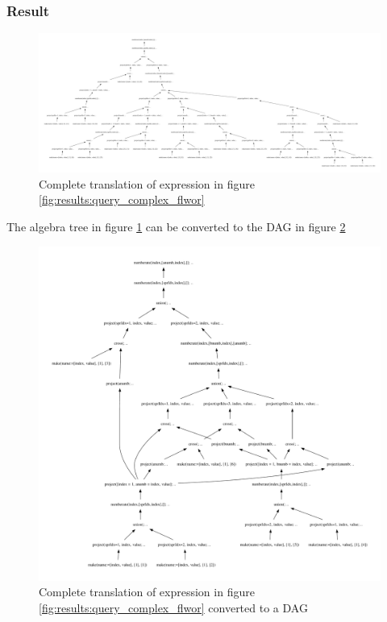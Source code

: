 \subsubsection{Result}
\begin{figure}[!htp]
\begin{center}
  \includegraphics[angle=90,height=0.7\textheight]{img/graphs/td_impl_flwor_complex_xq_relalg} \caption{Complete
  translation of expression in figure
  \ref{fig:results:query_complex_flwor}}
  \label{fig:results:query_complex_flwor_result}
\end{center}
\end{figure}


The algebra tree in figure \ref{fig:results:query_complex_flwor_result} can
be converted to the DAG in figure
\ref{fig:results:query_complex_flwor_result_dag}

\begin{figure}[!htp]
\begin{center}
  \includegraphics[width=1.0\textwidth]{img/graphs/td_impl_flwor_complex_xq_relalg_dag}
  \caption{Complete translation of expression in figure
  \ref{fig:results:query_complex_flwor} converted to a DAG}
  \label{fig:results:query_complex_flwor_result_dag}
\end{center}
\end{figure}
\newpage

